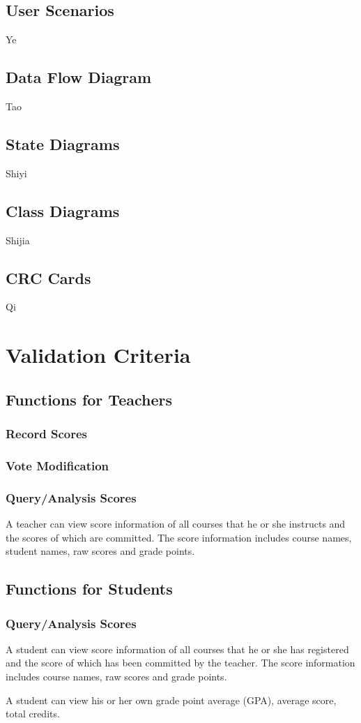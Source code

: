 \documentclass[a4]{article}
\begin{document}
\subsection{User Scenarios}
Ye
\subsection{Data Flow Diagram}
Tao
\subsection{State Diagrams}
Shiyi
\subsection{Class Diagrams}
Shijia
\subsection{CRC Cards}
Qi

\section{Validation Criteria}

\subsection{Functions for Teachers}
\subsubsection{Record Scores}

\subsubsection{Vote Modification}

\subsubsection{Query/Analysis Scores}
A teacher can view score information of all courses that he or she instructs and the scores of which are committed. The score information includes course names, student names, raw scores and grade points.


\subsection{Functions for Students}
\subsubsection{Query/Analysis Scores}
A student can view score information of all courses that he or she has registered and the score of which has been committed by the teacher. The score information includes course names, raw scores and grade points.


A student can view his or her own grade point average (GPA), average score, total credits.
\end{document}
